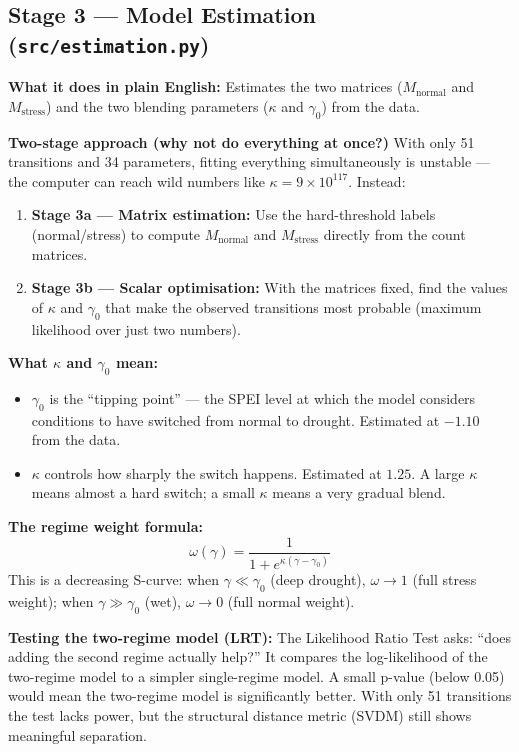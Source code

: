 \documentclass[12pt,a4paper]{article}
\begin{document}
\subsection{Stage 3 --- Model Estimation (\texttt{src/estimation.py})}

\textbf{What it does in plain English:}
Estimates the two matrices ($M_{\text{normal}}$ and $M_{\text{stress}}$) and
the two blending parameters ($\kappa$ and $\gamma_0$) from the data.

\textbf{Two-stage approach (why not do everything at once?)}
With only 51 transitions and 34 parameters, fitting everything simultaneously
is unstable --- the computer can reach wild numbers like
$\kappa = 9 \times 10^{117}$.  Instead:

\begin{enumerate}
  \item \textbf{Stage 3a --- Matrix estimation:}
        Use the hard-threshold labels (normal/stress) to compute
        $M_{\text{normal}}$ and $M_{\text{stress}}$ directly from the count
        matrices.
  \item \textbf{Stage 3b --- Scalar optimisation:}
        With the matrices fixed, find the values of $\kappa$ and $\gamma_0$
        that make the observed transitions most probable (maximum likelihood
        over just two numbers).
\end{enumerate}

\textbf{What $\kappa$ and $\gamma_0$ mean:}
\begin{itemize}[leftmargin=1.5em]
  \item $\gamma_0$ is the ``tipping point'' --- the SPEI level at which the
        model considers conditions to have switched from normal to drought.
        Estimated at $-1.10$ from the data.
  \item $\kappa$ controls how sharply the switch happens.  Estimated at $1.25$.
        A large $\kappa$ means almost a hard switch; a small $\kappa$ means a
        very gradual blend.
\end{itemize}

\textbf{The regime weight formula:}
\[
  \omega(\gamma) = \frac{1}{1 + e^{\kappa(\gamma - \gamma_0)}}
\]
This is a decreasing S-curve: when $\gamma \ll \gamma_0$ (deep drought),
$\omega \to 1$ (full stress weight); when $\gamma \gg \gamma_0$ (wet),
$\omega \to 0$ (full normal weight).

\textbf{Testing the two-regime model (LRT):}
The Likelihood Ratio Test asks: ``does adding the second regime actually
help?''  It compares the log-likelihood of the two-regime model to a simpler
single-regime model.  A small p-value (below 0.05) would mean the two-regime
model is significantly better.  With only 51 transitions the test lacks power,
but the structural distance metric (SVDM) still shows meaningful separation.
\end{document}
